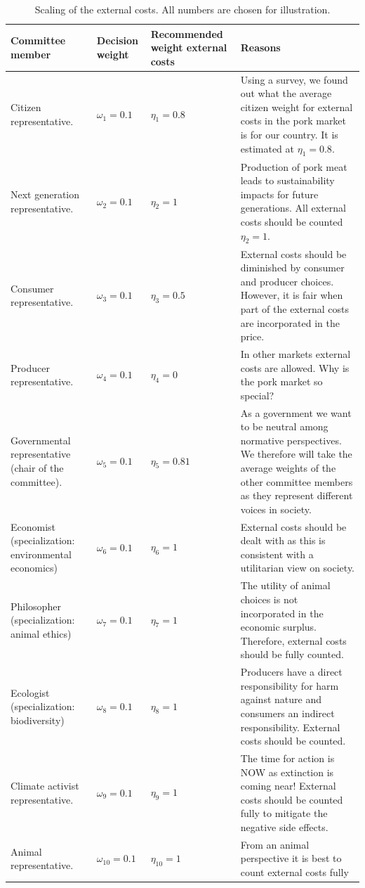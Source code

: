 \documentclass[
]{book}
\begin{document}
\begin{table}

\caption{\label{tab:scalingexternal}Scaling of the external costs. All numbers are chosen for illustration.}
\centering
\begin{tabular}[t]{llll}
\toprule
Committee member & Decision weight & Recommended weight external costs & Reasons\\
\midrule
Citizen representative. & $\omega_1 = 0.1$ & $\eta_1 = 0.8$ & Using a survey, we found out what the average citizen weight for external costs in the pork market is for our country. It is estimated at $\eta_1=0.8$.\\
Next generation representative. & $\omega_2 = 0.1$ & $\eta_2 = 1$ & Production of pork meat leads to sustainability impacts for future generations. All external costs should be counted $\eta_2=1$.\\
Consumer representative. & $\omega_3 = 0.1$ & $\eta_3 = 0.5$ & External costs should be diminished by consumer and producer choices. However, it is fair when part of the external costs are incorporated in the price.\\
Producer representative. & $\omega_4 = 0.1$ & $\eta_4 = 0$ & In other markets external costs are allowed. Why is the pork market so special?\\
Governmental representative (chair of the committee). & $\omega_5 = 0.1$ & $\eta_5 = 0.81$ & As a government we want to be neutral among normative perspectives. We therefore will take the average weights of the other committee members as they represent different voices in society.\\
\addlinespace
Economist (specialization: environmental economics) & $\omega_6 = 0.1$ & $\eta_6 = 1$ & External costs should be dealt with as this is consistent with a utilitarian view on society.\\
Philosopher (specialization: animal ethics) & $\omega_7 = 0.1$ & $\eta_7 = 1$ & The utility of animal choices is not incorporated in the economic surplus. Therefore, external costs should be fully counted.\\
Ecologist (specialization: biodiversity) & $\omega_8 = 0.1$ & $\eta_8 = 1$ & Producers have a direct responsibility for harm against nature and consumers an indirect responsibility. External costs should be counted.\\
Climate activist representative. & $\omega_9 = 0.1$ & $\eta_9 = 1$ & The time for action is NOW as extinction is coming near! External costs should be counted fully to mitigate the negative side effects.\\
Animal representative. & $\omega_{10} = 0.1$ & $\eta_{10} = 1$ & From an animal perspective it is best to count external costs fully\\
\bottomrule
\end{tabular}
\end{table}
\end{document}
